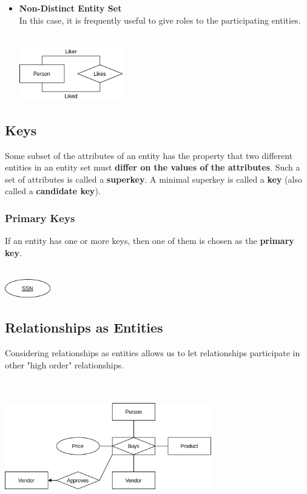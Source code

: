 \documentclass{article}
\begin{document}
\begin{itemize}
	\item \textbf{Non-Distinct Entity Set}
	\vspace{.2cm} \\
	In this case, it is frequently useful to give roles to the participating entities. \\ \\
	
	\centerline{\includegraphics[width=4.5cm]{./assets/nondistinct.png}}
	\vspace{.6cm}
\end{itemize}

\subsection{Keys}
Some subset of the attributes of an entity has the property that two different entities in an entity set must \textbf{differ on the values of the attributes}. Such a set of attributes is called a \textbf{superkey}. A minimal superkey is called a \textbf{key} (also called a \textbf{candidate key}).

\subsubsection{Primary Keys}
If an entity has one or more keys, then one of them is chosen as the \textbf{primary key}. \\ \\

\centerline{\includegraphics[width=2cm]{./assets/key.png}}

\subsection{Relationships as Entities}
Considering relationships as entities allows us to let relationships participate in other "high order" relationships. \\ \\ \\

\centerline{\includegraphics[width=9cm]{./assets/rel-ent.png}}
\vspace{.6cm}
\end{document}
